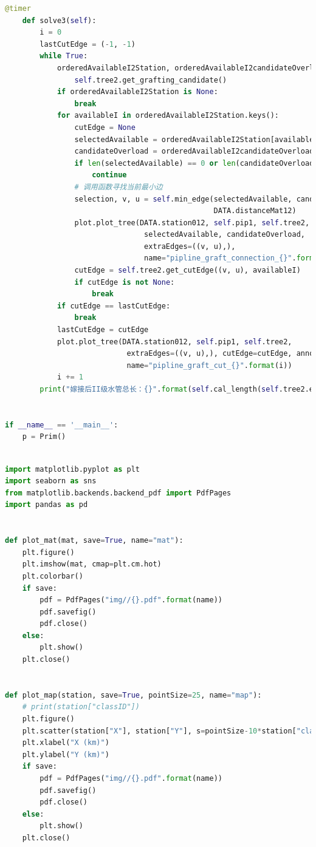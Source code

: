 \documentclass{cumcmthesis}
\begin{document}
\begin{appendices}
\begin{lstlisting}[language=python]
    @timer
    def solve3(self):
        i = 0
        lastCutEdge = (-1, -1)
        while True:
            orderedAvailableI2Station, orderedAvailableI2candidateOverload =\
                self.tree2.get_grafting_candidate()
            if orderedAvailableI2Station is None:
                break
            for availableI in orderedAvailableI2Station.keys():
                cutEdge = None
                selectedAvailable = orderedAvailableI2Station[availableI]
                candidateOverload = orderedAvailableI2candidateOverload[availableI]
                if len(selectedAvailable) == 0 or len(candidateOverload) == 0:
                    continue
                # 调用函数寻找当前最小边
                selection, v, u = self.min_edge(selectedAvailable, candidateOverload,
                                                DATA.distanceMat12)
                plot.plot_tree(DATA.station012, self.pip1, self.tree2,
                                selectedAvailable, candidateOverload,
                                extraEdges=((v, u),),
                                name="pipline_graft_connection_{}".format(i))
                cutEdge = self.tree2.get_cutEdge((v, u), availableI)
                if cutEdge is not None:
                    break
            if cutEdge == lastCutEdge:
                break
            lastCutEdge = cutEdge
            plot.plot_tree(DATA.station012, self.pip1, self.tree2,
                            extraEdges=((v, u),), cutEdge=cutEdge, annotateIIStation=False,
                            name="pipline_graft_cut_{}".format(i))
            i += 1
        print("嫁接后II级水管总长：{}".format(self.cal_length(self.tree2.edges)[0]))


if __name__ == '__main__':
    p = Prim()
    
  \end{lstlisting}
  \begin{lstlisting}[language=python]
import matplotlib.pyplot as plt
import seaborn as sns
from matplotlib.backends.backend_pdf import PdfPages
import pandas as pd


def plot_mat(mat, save=True, name="mat"):
    plt.figure()
    plt.imshow(mat, cmap=plt.cm.hot)
    plt.colorbar()
    if save:
        pdf = PdfPages("img//{}.pdf".format(name))
        pdf.savefig()
        pdf.close()
    else:
        plt.show()
    plt.close()


def plot_map(station, save=True, pointSize=25, name="map"):
    # print(station["classID"])
    plt.figure()
    plt.scatter(station["X"], station["Y"], s=pointSize-10*station["classID"], c=station["classID"], cmap="Set1")
    plt.xlabel("X (km)")
    plt.ylabel("Y (km)")
    if save:
        pdf = PdfPages("img//{}.pdf".format(name))
        pdf.savefig()
        pdf.close()
    else:
        plt.show()
    plt.close()



\end{lstlisting}
\end{appendices}
\end{document}
